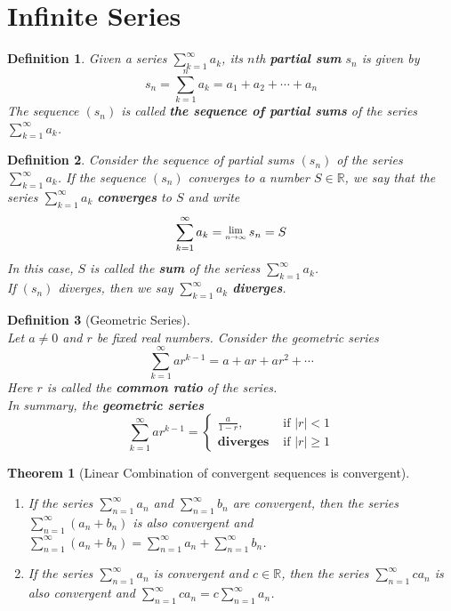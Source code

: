 \documentclass[8pt]{article}
\newcommand{\Lim}[1]{\raisebox{0.5ex}{\scalebox{0.8}{$\displaystyle \lim_{#1}\;$}}}
\newtheorem{definition}{Definition}[section]
\newtheorem{theorem}{Theorem}[section]
\theoremstyle{definition}
\begin{document}
\section{Infinite Series}
\begin{definition}\normalfont Given a series $\sum_{k=1}^\infty a_k$, its $n$th \textbf{partial sum} $s_n$ is given by
\[
s_n=\sum_{k=1}^n a_k = a_1+a_2+\cdots+a_n
\]
The sequence $(s_n)$ is called \textbf{the sequence of partial sums} of the series $\sum_{k=1}^\infty a_k$.
\end{definition}
\begin{definition}\normalfont Consider the sequence of partial sums $(s_n)$ of the series $\sum_{k=1}^\infty a_k$. If the sequence $(s_n)$ converges to a number $S\in\mathbb{R}$, we say that the series $\sum_{k=1}^\infty a_k$ \textbf{converges} to $S$ and write
\[
\sum_{k=1}^\infty a_k = \Lim{n\to\infty}s_n=S
\]
In this case, $S$ is called the \textbf{sum} of the seriess $\sum_{k=1}^\infty a_k$.\\
If $(s_n)$ diverges, then we say $\sum_{k=1}^\infty a_k$ \textbf{diverges}.
\end{definition}
\begin{definition}[Geometric Series]
\hfill\\\normalfont Let $a\neq 0$ and $r$ be fixed real numbers. Consider the geometric series
\[
\sum_{k=1}^\infty ar^{k-1} = a+ar+ar^2+\cdots
\]
Here $r$ is called the \textbf{common ratio} of the series.\\
In summary, the \textbf{geometric series}
\[
\sum_{k=1}^\infty ar^{k-1}=\begin{cases}
\frac{a}{1-r},&\text{ if }|r|<1\\
\textbf{diverges}&\text{ if }|r|\geq 1
\end{cases}
\]
\end{definition}
\begin{theorem}[Linear Combination of convergent sequences is convergent]
\hfill\\\normalfont
\begin{enumerate}
\item If the series $\sum_{n=1}^\infty a_n$ and $\sum_{n=1}^\infty b_n$ are convergent, then the series $\sum_{n=1}^\infty (a_n+b_n)$ is also convergent and  $\sum_{n=1}^\infty (a_n+b_n)=\sum_{n=1}^\infty a_n+\sum_{n=1}^\infty b_n$.
\item If the series $\sum_{n=1}^\infty a_n$ is convergent and $c\in\mathbb{R}$, then the series $\sum_{n=1}^\infty ca_n$ is also convergent and $\sum_{n=1}^\infty ca_n=c\sum_{n=1}^\infty a_n$.
\end{enumerate}
\end{theorem}
\end{document}
